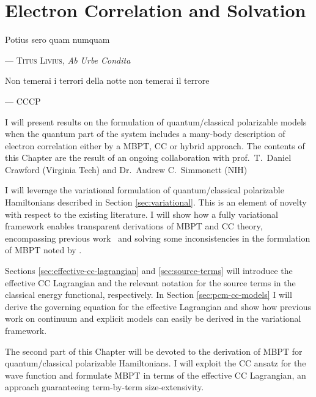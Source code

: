 \chapter{Electron Correlation and Solvation}\label{ch:solvation-correlation}

\epigraph{Potius sero quam numquam}{--- \textsc{Titus Livius}, \textit{Ab Urbe Condita}}
\epigraph{\textitalian{Non temerai i terrori della notte non temerai il terrore}}{--- \textsc{CCCP}}

I will present results on the formulation of quantum/classical
polarizable models when the quantum part of the system includes a
many-body description of electron correlation either by a \gls{MBPT},
\gls{CC} or hybrid approach.
The contents of this Chapter are the result of an ongoing collaboration
with prof.~T.~Daniel Crawford (Virginia Tech) and Dr.~Andrew
C.~Simmonett (NIH)

I will leverage the variational formulation of quantum/classical
polarizable Hamiltonians described in Section \ref{sec:variational}.
This is an element of novelty with respect to the existing literature.
I will show how a fully variational framework enables transparent
derivations of \acrshort{MBPT} and \acrshort{CC} theory, encompassing
previous work~\autocite{Christiansen1999-tj, Cammi2009-gu,
Caricato2010-hx, Caricato2011-tx, Olivares_del_Valle1991-of,
Aguilar1991-vq, Olivares_del_Valle1991-tq, Olivares_del_Valle1993-xq,
Olivares_del_Valle1993-ra, Surjan1983-oc, Angyan1991-mr, Angyan1993-ay,
Angyan2008-nj, Nielsen2001-yl, Kongsted2003-py, Sneskov2010-dz,
Sneskov2011-jm, Schwabe2012-cf}
and solving some inconsistencies in the formulation of \acrshort{MBPT}
noted by \citeauthor{Angyan1995-co}.\autocite{Angyan1995-co,
Lipparini2009-io}

Sections \ref{sec:effective-cc-lagrangian} and \ref{sec:source-terms}
will introduce the effective \acrshort{CC} Lagrangian and the relevant
notation for the source terms in the classical energy functional,
respectively.
In Section \ref{sec:pcm-cc-models} I will derive the governing equation
for the effective Lagrangian and show how previous work on
continuum\autocite{Christiansen1999-tj, Cammi2009-gu, Caricato2011-tx}
and explicit models\autocite{Kongsted2003-py, Sneskov2011-jm} can easily
be derived in the variational framework.

The second part of this Chapter will be devoted to the derivation of
\acrshort{MBPT} for quantum/classical polarizable Hamiltonians.
I will exploit the \acrshort{CC} ansatz for the wave function and formulate
\acrshort{MBPT} in terms of the effective \acrshort{CC} Lagrangian, an approach
guaranteeing term-by-term size-extensivity.

